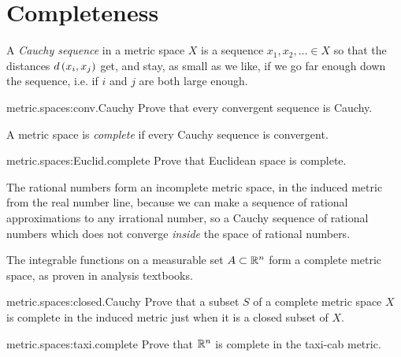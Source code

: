 \section{Completeness}
A \emph{Cauchy sequence} in a metric space \(X\) is a sequence \(x_1, x_2, \dots \in X\) so that the distances \(d\left(x_i,x_j\right)\) get, and stay, as small as we like, if we go far enough down the sequence, i.e. if \(i\) and \(j\) are both large enough.
\begin{problem}{metric.spaces:conv.Cauchy}
Prove that every convergent sequence is Cauchy.
\end{problem}
A metric space is \emph{complete} if every Cauchy sequence is convergent.
\begin{problem}{metric.spaces:Euclid.complete}
Prove that Euclidean space is complete.
\end{problem}
\begin{example}
The rational numbers form an incomplete metric space, in the induced metric from the real number line, because we can make a sequence of rational approximations to any irrational number, so a Cauchy sequence of rational numbers which does not converge \emph{inside} the space of rational numbers.
\end{example}
\begin{example}
The integrable functions on a measurable set \(A \subset \mathbb{R}^{n}\) form a complete metric space, as proven in analysis textbooks.
\end{example}
\begin{problem}{metric.spaces:closed.Cauchy}
Prove that a subset \(S\) of a complete metric space \(X\) is complete in the induced metric just when it is a closed subset of \(X\).
\end{problem}
\begin{problem}{metric.spaces:taxi.complete}
Prove that \(\mathbb{R}^{n}\) is complete in the taxi-cab metric.
\end{problem}

